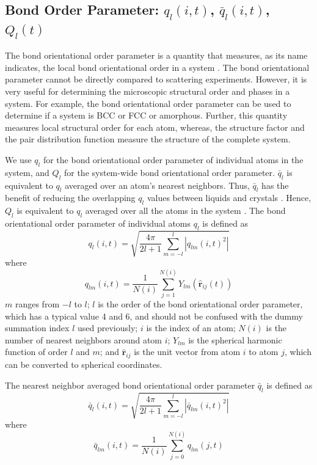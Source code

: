 \documentclass{article}
\begin{document}
\subsection{Bond Order Parameter: $q_l(i,t)$, $\bar{q}_l(i,t)$, $Q_l(t)$} \label{sec::BOP}
The bond orientational order parameter is a quantity that measures, as its name indicates, the local bond orientational order in a system \cite{BOP_first, BOP}. The bond orientational parameter cannot be directly compared to scattering experiments. However, it is very useful for determining the microscopic structural order and phases in a system. For example, the bond orientational order parameter can be used to determine if a system is BCC or FCC or amorphous. Further, this quantity measures local structural order for each atom, whereas, the structure factor and the pair distribution function measure the structure of the complete system.

We use $q_l$ for the bond orientational order parameter of individual atoms in the system, and $Q_l$ for the system-wide bond orientational order parameter. $\bar{q}_l$ is equivalent to $q_l$ averaged over an atom's nearest neighbors. Thus, $\bar{q}_l$ has the benefit of reducing the overlapping $q_l$ values between liquids and crystals \cite{BOP}. Hence, $Q_l$ is equivalent to $q_l$ averaged over all the atoms in the system \cite{BOP_first}.  The bond orientational order parameter of individual atoms $q_l$ is defined as
\begin{equation}
	q_l(i,t) = \sqrt{\frac{4\pi}{2l+1} \sum_{m=-l}^l\left|q_{lm}(i,t)^2\right|}
\end{equation}
where
\begin{equation}
	q_{lm}(i,t) = \frac{1}{N(i)}\sum_{j=1}^{N(i)}Y_{lm}(\hat{\mathbf{r}}_{ij}(t))
\end{equation}
$m$ ranges from $-l$ to $l$; $l$ is the order of the bond orientational order parameter, which has a typical value 4 and 6, and should not be confused with the dummy summation index $l$ used previously; $i$ is the index of an atom; $N(i)$ is the number of nearest neighbors around atom $i$; $Y_{lm}$ is the spherical harmonic function of order $l$ and $m$; and $\hat{\mathbf{r}}_{ij}$ is the unit vector from atom $i$ to atom $j$, which can be converted to spherical coordinates. 

The nearest neighbor averaged bond orientational order parameter $\bar{q}_l$ is defined as
\begin{equation}
	\bar{q}_l(i,t) = \sqrt{\frac{4\pi}{2l+1} \sum_{m=-l}^l\left|\bar{q}_{lm}(i,t)^2\right|}
\end{equation}
where
\begin{equation}
	\bar{q}_{lm}(i,t) = \frac{1}{N(i)}\sum_{j=0}^{N(i)}q_{lm}(j,t)
\end{equation}
\end{document}
